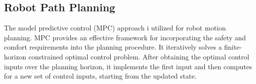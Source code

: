\documentclass[letterpaper, 10 pt, conference]{ieeeconf}
\newcommand{\todonote}[1]{\vspace{0px} %
	\todo[inline, color=green!30]{\textbf{[Note:]} {#1}} %
}
\begin{document}
	\subsection{Robot Path Planning}\label{subsec:robot_path_plan}
	The model predictive control (MPC) approach i utilized for robot motion planning.
	MPC provides an effective framework for incorporating the safety and comfort requirements into the planning procedure.
	It iteratively solves a finite-horizon constrained optimal control problem.
	After obtaining the optimal control inputs over the planning horizon, it implements the first input and then computes for a new set of control inputs, starting from the updated state.
\end{document}
